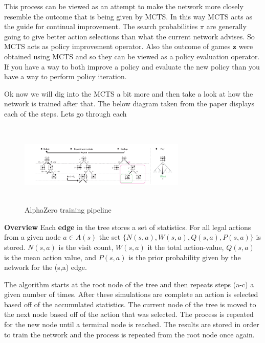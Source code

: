     This process can be viewed as an attempt to make the network more closely resemble the outcome that is being given by MCTS. In this way MCTS acts as the guide for continual improvement. The search probabilities $\pi$ are generally going to give better action selections than what the current network advises. So MCTS acts as policy improvement operator. Also the outcome of games $\textbf{z}$ were obtained using MCTS and so they can be viewed as a policy evaluation operator. If you have a way to both improve a policy and evaluate the new policy than you have a way to perform policy iteration.
    
    Ok now we will dig into the MCTS a bit more and then take a look at how the network is trained after that. The below diagram taken from the paper displays each of the steps. Lets go through each
    
    \begin{figure}[H]
       \centering
       \includegraphics[width=300px,height=150px]{images/alpha_paper_figure_2.png}
       \caption{AlphaZero training pipeline}
       \label{fig:my_label}
   \end{figure}
   
   \textbf{Overview} Each \textbf{edge} in the tree stores a set of statistics. For all legal actions from a given node $ a \in A(s) $ the set $\{ N(s,a),W(s,a),Q(s,a),P(s,a) \}$ is stored. $N(s,a)$ is the visit count, $W(s,a)$ it the total action-value, $Q(s,a)$ is the mean action value, and $P(s,a)$ is the prior probability given by the network for the (s,a) edge. 
       
   The algorithm starts at the root node of the tree and then repeats steps (a-c) a given number of times. After these simulations are complete an action is selected based off of the accumulated statistics. The current node of the tree is moved to the next node based off of the action that was selected. The process is repeated for the new node until a terminal node is reached. The results are stored in order to train the network and the process is repeated from the root node once again. 
   
